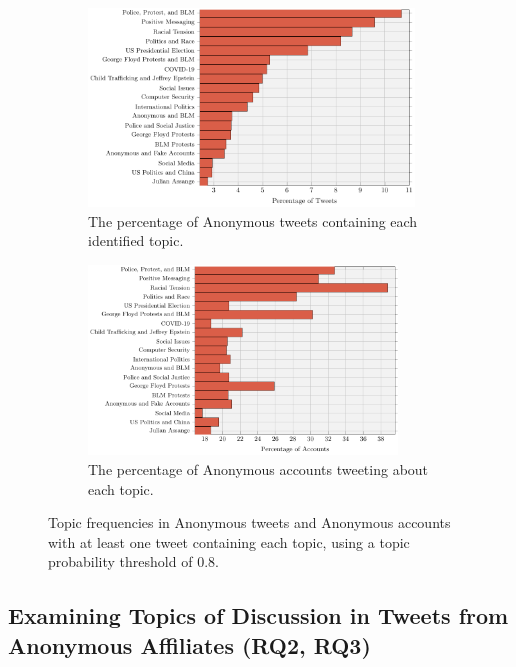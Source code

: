 \documentclass[letterpaper]{article}
\begin{document}
\begin{figure}[!htp]
\centering
\begin{subfigure}[b]{0.4\textwidth}
\centering
\includegraphics[width=0.95\textwidth]{topic_tweet_perc.pdf}
\caption{The percentage of Anonymous tweets containing each identified topic.}
\label{fig:topicTweetPercs}
\end{subfigure}
\quad
\begin{subfigure}[b]{0.4\textwidth}
\centering
\includegraphics[width=0.9\textwidth]{topic_account_perc.pdf}
\caption{The percentage of Anonymous accounts tweeting about each topic.}
\label{fig:topicAccountPercs}
\end{subfigure}
\caption{Topic frequencies in Anonymous tweets and Anonymous accounts with at least one tweet containing each topic, using a topic probability threshold of 0.8.}
\label{fig:topicPercs}
\end{figure}

\subsection{Examining Topics of Discussion in Tweets from Anonymous Affiliates (RQ2, RQ3)}
\label{topic_analysis}
\end{document}
